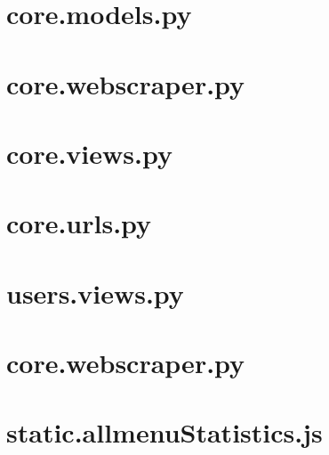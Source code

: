 \section{core.models.py}\label{code:core.models.py}

\section{core.webscraper.py}\label{code:core.webscraper.py}

\section{core.views.py}\label{code:core.views.py}

\section{core.urls.py}\label{code:core.urls.py}

\section{users.views.py}\label{code:users.views.py}

\section{core.webscraper.py}\label{code:core.webscraper.py}

\section{static.allmenuStatistics.js}\label{code:static.allmenuStatistics.js}




